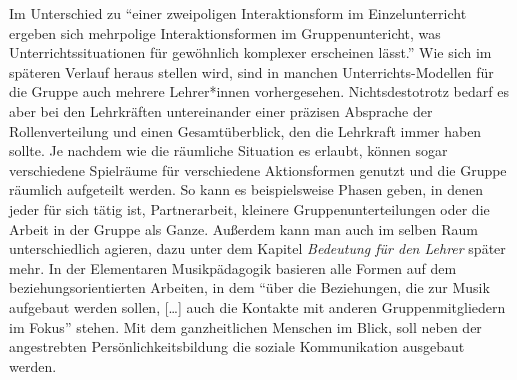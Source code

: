 Im Unterschied zu \enquote{einer zweipoligen Interaktionsform im
Einzelunterricht ergeben sich mehrpolige Interaktionsformen im Gruppenuntericht,
was Unterrichtssituationen für gewöhnlich komplexer erscheinen lässt.}
\autocite[30]{losert:die_kunst_zu_unterrichten} Wie sich im späteren Verlauf heraus stellen wird,
sind in manchen Unterrichts-Modellen für die Gruppe auch mehrere Lehrer*innen
vorhergesehen. Nichtsdestotrotz bedarf es aber bei den Lehrkräften untereinander
einer präzisen Absprache der Rollenverteilung und einen Gesamtüberblick, den die
Lehrkraft immer haben sollte. Je nachdem wie die räumliche Situation es erlaubt,
können sogar verschiedene Spielräume für verschiedene Aktionsformen genutzt und
die Gruppe räumlich aufgeteilt werden. So kann es beispielsweise Phasen geben,
in denen jeder für sich tätig ist, Partnerarbeit, kleinere Gruppenunterteilungen
oder die Arbeit in der Gruppe als Ganze. Außerdem kann man auch im selben
Raum unterschiedlich agieren, dazu unter dem Kapitel \emph{Bedeutung für den
Lehrer} später mehr. In der Elementaren Musikpädagogik basieren alle Formen auf
dem beziehungsorientierten Arbeiten, in dem \enquote{über die Beziehungen, die
zur Musik aufgebaut werden sollen, […] auch die Kontakte mit anderen
Gruppenmitgliedern im Fokus} \autocite[10]{dartsch:kern_des_musizierens} stehen.
Mit dem ganzheitlichen Menschen im Blick, soll neben der angestrebten
Persönlichkeitsbildung die soziale Kommunikation ausgebaut werden.
